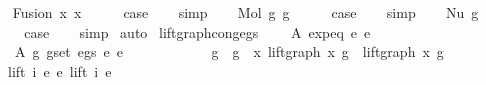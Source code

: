 \begin{isabellebody}
\isamarkupfalse%
\isanewline
\ \ \isamarkupfalse%
\ {\isacharparenleft}{\kern0pt}Fusion\ x{}\ x{}{\isacharparenright}{\kern0pt}\isanewline
\ \ \isamarkupfalse%
\ \isamarkupfalse%
\ {\isacharquery}{\kern0pt}case\isanewline
\ \ \isamarkupfalse%
\ simp\isanewline
{}\isamarkupfalse%
\isanewline
\ \ \isamarkupfalse%
\ {\isacharparenleft}{\kern0pt}Mol\ g{}\ g{}{\isacharparenright}{\kern0pt}\isanewline
\ \ \isamarkupfalse%
\ \isamarkupfalse%
\ {\isacharquery}{\kern0pt}case\isanewline
\ \ \isamarkupfalse%
\ simp\isanewline
{}\isamarkupfalse%
\isanewline
\ \ \isamarkupfalse%
\ {\isacharparenleft}{\kern0pt}Nu\ g{\isacharparenright}{\kern0pt}\isanewline
\ \ \isamarkupfalse%
\ \isamarkupfalse%
\ {\isacharquery}{\kern0pt}case\isanewline
\ \ \isamarkupfalse%
\ simp\isanewline
{}\isamarkupfalse%
\ auto%
\endisatagproof
{\isafoldproof}%
%
\isadelimproof
\isanewline
%
\endisadelimproof
\isanewline
\isanewline
{}\isamarkupfalse%
\ lift{\isacharunderscore}{\kern0pt}graph{\isacharunderscore}{\kern0pt}cong{\isacharunderscore}{\kern0pt}egs{\isacharcolon}{\kern0pt}\isanewline
\ \ \ \ A{}{\isacharcolon}{\kern0pt}\ {\isachardoublequoteopen}expeq\ e{}\ e{}{\isachardoublequoteclose}\isanewline
\ \ \ \ A{}{\isacharcolon}{\kern0pt}\ {\isachardoublequoteopen}{\isasymforall}{\isacharparenleft}{\kern0pt}g{}{\isacharcomma}{\kern0pt}\ g{}{\isacharparenright}{\kern0pt}{\isasymin}set\ {\isacharparenleft}{\kern0pt}egs\ e{}\ e{}{\isacharparenright}{\kern0pt}{\isachardot}{\kern0pt}\isanewline
\ \ \ \ \ \ \ \ \ \ \ \ g{}\ {\isasymsimeq}\ g{}\ {\isasymand}\ {\isacharparenleft}{\kern0pt}{\isasymforall}x{\isachardot}{\kern0pt}\ lift{\isacharunderscore}{\kern0pt}graph\ x\ g{}\ {\isasymsimeq}\ lift{\isacharunderscore}{\kern0pt}graph\ x\ g{}{\isacharparenright}{\kern0pt}{\isachardoublequoteclose}\isanewline
\ \ \ {\isachardoublequoteopen}lift\ i\ e{}\ {\isasymsimeq}e\ lift\ i\ e{}{\isachardoublequoteclose}\isanewline
%
\isadelimproof
%
\endisadelimproof
%
\isatagproof
{}\isamarkupfalse%

\end{isabellebody}

